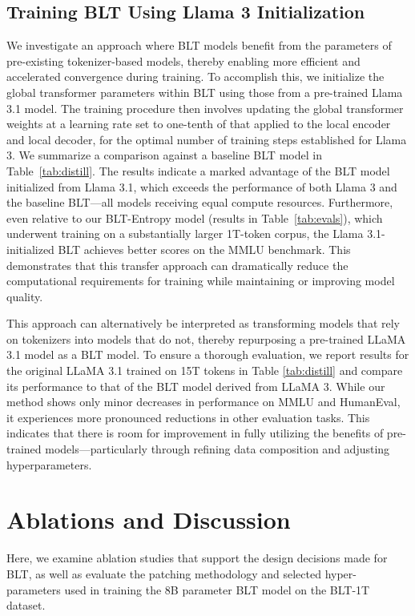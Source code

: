 \subsection{Training {\textsc BLT} Using Llama 3 Initialization}
\label{sec:distillation}
We investigate an approach where {\textsc BLT} models benefit from the parameters of pre-existing tokenizer-based models, thereby enabling more efficient and accelerated convergence during training. To accomplish this, we initialize the global transformer parameters within {\textsc BLT} using those from a pre-trained Llama 3.1 model. The training procedure then involves updating the global transformer weights at a learning rate set to one-tenth of that applied to the local encoder and local decoder, for the optimal number of training steps established for Llama 3. We summarize a comparison against a baseline {\textsc BLT} model in Table~\ref{tab:distill}. The results indicate a marked advantage of the {\textsc BLT} model initialized from Llama 3.1, which exceeds the performance of both Llama 3 and the baseline {\textsc BLT}—all models receiving equal compute resources. Furthermore, even relative to our {\textsc BLT}-Entropy model (results in Table~\ref{tab:evals}), which underwent training on a substantially larger 1T-token corpus, the Llama 3.1-initialized {\textsc BLT} achieves better scores on the MMLU benchmark. This demonstrates that this transfer approach can dramatically reduce the computational requirements for training while maintaining or improving model quality.

This approach can alternatively be interpreted as transforming models that rely on tokenizers into models that do not, thereby repurposing a pre-trained LLaMA 3.1 model as a {\textsc BLT} model. To ensure a thorough evaluation, we report results for the original LLaMA 3.1 trained on 15T tokens in Table \ref{tab:distill} and compare its performance to that of the {\textsc BLT} model derived from LLaMA 3. While our method shows only minor decreases in performance on MMLU and HumanEval, it experiences more pronounced reductions in other evaluation tasks. This indicates that there is room for improvement in fully utilizing the benefits of pre-trained models—particularly through refining data composition and adjusting hyperparameters.

\section{Ablations and Discussion}
\label{section:ablations}
Here, we examine ablation studies that support the design decisions made for {\textsc BLT}, as well as evaluate the patching methodology and selected hyper-parameters used in training the 8B parameter {\textsc BLT} model on the {\textsc BLT}-1T dataset.

